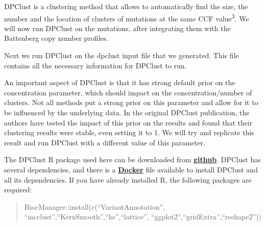 \documentclass[]{article}
\begin{document}
DPClust is a clustering method that allows to automatically find the
size, the number and the location of clusters of mutations at the same
CCF value\textsuperscript{3}. We will now run DPClust on the mutations,
after integrating them with the Battenberg copy number profiles.

Next we run DPClust on the dpclust input file that we generated. This
file contains all the necessary information for DPClust to run.

An important aspect of DPClust is that it has strong default prior on
the concentration parameter, which should impact on the
concentration/number of clusters. Not all methods put a strong prior on
this parameter and allow for it to be influenced by the underlying data.
In the original DPClust publication, the authors have tested the impact
of this prior on the results and found that their clustering results
were stable, even setting it to 1. We will try and replicate this result
and run DPClust with a different value of this parameter.

The DPClust R package used here can be downloaded from
\href{https://github.com/Wedge-Oxford/dpclust_smchet_docker/blob/master/dpclust_v2.2.5.tar.gz}{\textbf{github}}.
DPClust has several dependencies, and there is a
\href{https://github.com/Wedge-Oxford/dpclust_smchet_docker/blob/master/Dockerfile}{\textbf{Docker}}
file available to install DPClust and all its dependencies. If you have
already installed R, the following packages are required:

\begin{quote}
BiocManager::install(c(``VariantAnnotation'',
``mcclust'',``KernSmooth'',``ks'',``lattice'',
``ggplot2'',``gridExtra'',``reshape2''))
\end{quote}
\end{document}

